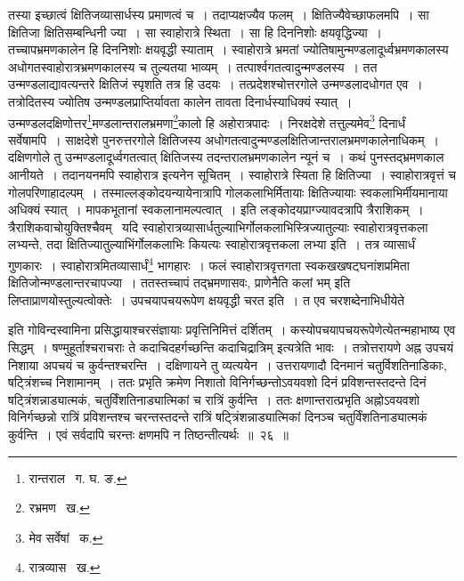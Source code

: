 \documentclass[11pt, openany]{book}
\begin{document}
\noindent तस्या इच्छात्वं क्षितिजव्यासार्धस्य प्रमाणत्वं च~। तदाप्यक्षज्यैव फलम्~। क्षितिज्यैवेच्छाफलमपि~। सा क्षितिजा क्षितिसम्बन्धिनी ज्या~। सा स्वाहोरात्रे स्थिता~। सा हि दिननिशोः क्षयवृद्धिज्या~। तच्चापभ्रमणकालेन हि दिननिशोः क्षयवृद्धी स्याताम्~। स्वाहोरात्रे भ्रमतां ज्योतिषामुन्मण्डलादूर्ध्वभ्रमणकालस्य अधोगतस्वाहोरात्रभ्रमणकालस्य च तुल्यतया भाव्यम्~। तत्पार्श्वगतत्वादुन्मण्डलस्य~। तत उन्मण्डलाद्यावत्यन्तरे क्षितिजं स्पृशति तत्र हि उदयः~। तत्प्रदेशश्चोत्तरगोले उन्मण्डलादधोगत एव~। तत्रोदितस्य 
ज्योतिष उन्मण्डलप्राप्तिर्यावता कालेन तावता दिनार्धस्याधिक्यं स्यात्~।
उन्मण्डलदक्षिणोत्तर\renewcommand{\thefootnote}{१}\footnote{रान्तराल \textendash\ ग. घ. ङ.}मण्डलान्तरालभ्रमणा\renewcommand{\thefootnote}{२}\footnote{रभ्रमण \textendash\ ख.}कालो हि अहोरात्रपादः~। निरक्षदेशे तत्तुल्यमेव\renewcommand{\thefootnote}{३}\footnote{मेव सर्वेषां \textendash\ क.} दिनार्धं सर्वेषामपि~। साक्षदेशे पुनरुत्तरगोले क्षितिजस्य अधोगतत्वादुन्मण्डलक्षितिजान्तरालभ्रमणकालेनाधिकम्~। दक्षिणगोले तु उन्मण्डलादूर्ध्वगतत्वात् क्षितिजस्य तदन्तरालभ्रमणकालेन न्यूनं च~। कथं पुनस्तद्भ्रमणकाल आनीयते~। तदानयनमपि स्वाहोरात्र इत्यनेन सूचितम्~। स्वाहोरात्रे स्यिता हि क्षितिज्या~। स्वाहोरात्रवृत्तं च गोलपरिणाहादल्पम्~। तस्माल्लङ्कोदयन्यायेनात्रापि गोलकलाभिर्मितायाः क्षितिज्यायाः स्वकलाभिर्मीयमानाया अधिक्यं स्यात्~। मापकभूतानां स्वकलानामल्पत्वात्~। इति लङ्कोदयप्राग्ज्यावदत्रापि त्रैराशिकम्~। त्रैराशिकवाचोयुक्तिश्चैवम् \textendash\ यदि स्वाहोरात्रव्यासार्धतुल्याभिर्गोलकलाभिस्त्रिज्यातुल्याः स्वाहोरात्रवृत्तकला लभ्यन्ते, तदा क्षितिज्यातुल्याभिंर्गोलकलाभिः कियत्यः स्वाहोरात्रवृत्तकला लभ्या इति~। तत्र व्यासार्धं गुणकारः~। स्वाहोरात्रमितव्यासार्धं\renewcommand{\thefootnote}{४}\footnote{रात्रव्यास \textendash\ ख.} भागहारः~। फलं स्वाहोरात्रवृत्तगता स्वकखखषट्घनांशप्रमिता क्षितिजोन्मण्डलान्तरचापज्या~। ततस्तच्चापं तद्भ्रमणासवः, {\qt प्राणेनैति कलां भम्} इति लिप्ताप्राणयोस्तुल्यत्वोक्तेः~। उपचयापचयरूपेण क्षयवृद्धी चरत इति~। {\qt त एव चरशब्देनाभिधीयेते}

\newpage

\noindent इति गोविन्दस्वामिना प्रसिद्धायाश्चरसंज्ञायाः प्रवृत्तिनिमित्तं दर्शितम्~। कस्योपचयापचयरूपेणेत्येतन्महाभाष्य एव सिद्धम्~।
{\qt षण्मुहूर्ताश्चराचराः ते कदाचिदहर्गच्छन्ति कदाचिद्रात्रिम्} इत्यत्रेति भावः~। तत्रोत्तरायणे अह्न उपचयं निशाया अपचयं च कुर्वन्तश्चरन्ति~। दक्षिणायने तु व्यत्ययेन~। उत्तरायणादौ दिनमानं चतुर्विशतिनाडिकाः, षट्त्रिंशच्च निशामानम्~। ततः प्रभृति क्रमेण निशातो विनिर्गच्छन्तोऽवयवशो दिनं प्रविशन्तस्तदन्ते दिनं षट्त्रिंशन्नाड्यात्मकं, चतुर्विंशतिनाड्यात्मिकां च रात्रिं कुर्वन्ति~। ततः क्षणान्तरात्प्रभृति अह्नोऽवयवशो विनिर्गच्छन्नो रात्रिं प्रविशन्तश्च चरन्तस्तदन्ते रात्रिं षट्त्रिंशन्नाड्यात्मिकां दिनञ्च चतुर्विंशतिनाड्यात्मकं कुर्वन्ति~। एवं सर्वदापि चरन्तः क्षणमपि न तिष्ठन्तीत्यर्थः~॥~२६~॥ \\
\end{document}

